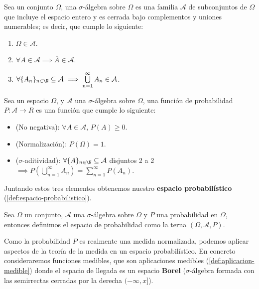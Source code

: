 \begin{definicion}
  Sea un conjunto $\Omega$, una $\sigma$-álgebra sobre $\Omega$ es una familia $\mathcal{A}$ de subconjuntos de $\Omega$ que incluye el espacio entero y es cerrada bajo complementos y uniones numerables; es decir, que cumple lo siguiente:
  \begin{enumerate}
    \item $\Omega \in \mathcal{A}$.
    \item $\forall A \in \mathcal{A} \implies \overline{A} \in \mathcal{A}$.
    \item $\forall \{A_n\}_{n \in \N} \subseteq \mathcal{A} \implies \bigcup \limits^\infty_{n = 1} A_n \in \mathcal{A}$.
  \end{enumerate}
  \label{def:sigma-algebra}
\end{definicion}

\begin{definicion}
  Sea un espacio $\Omega$, y $\mathcal{A}$ una $\sigma$-álgebra sobre $\Omega$, una función de probabilidad $P : \mathcal{A} \to R$ es una función que cumple lo siguiente:
  \begin{itemize}
    \item (No negativa): $\forall A \in \mathcal{A}, \, P(A) \geq 0$.
    \item (Normalización): $P(\Omega) = 1$.
    \item ($\sigma$-aditividad): $\forall \{A\}_{n \in \N} \subseteq \mathcal{A}$ disjuntos 2 a 2 $\implies P \left(\bigcup \limits^\infty_{n = 1} A_n \right) = \sum \limits^\infty_{n = 1} P(A_n)$.
  \end{itemize}
  \label{def:probabilidad}
\end{definicion}

Juntando estos tres elementos obtenemos nuestro \textbf{espacio probabilístico} (\autoref{def:espacio-probabilistico}).

\begin{definicion}
  Sea $\Omega$ un conjunto, $\mathcal{A}$ una $\sigma$-álgebra sobre $\Omega$ y $P$ una probabilidad en $\Omega$, entonces definimos el espacio de probabilidad como la terna $(\Omega, \mathcal{A}, P)$.
  \label{def:espacio-probabilistico}
\end{definicion}

Como la probabilidad $P$ es realmente una medida normalizada, podemos aplicar aspectos de la teoría de la medida en un espacio probabilístico. En concreto consideraremos funciones medibles, que son aplicaciones medibles (\autoref{def:aplicacion-medible}) donde el espacio de llegada es un espacio \textbf{Borel} ($\sigma$-álgebra formada con las semirrectas cerradas por la derecha $(-\infty, x]$).

